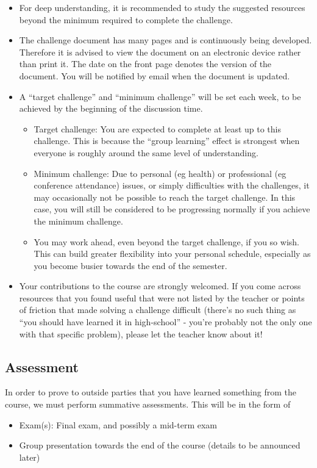 \begin{itemize}
    \item For deep understanding, it is recommended to study the suggested resources beyond the minimum required to complete the challenge.
    \item The challenge document has many pages and is continuously being developed. Therefore it is advised to view the document on an electronic device rather than print it. The date on the front page denotes the version of the document. You will be notified by email when the document is updated.
    \item A “target challenge” and “minimum challenge” will be set each week, to be achieved by the beginning of the discussion time.
    \begin{itemize}
        \item Target challenge: You are expected to complete at least up to this challenge. This is because the “group learning” effect is strongest when everyone is roughly around the same level of understanding.
        \item Minimum challenge: Due to personal (eg health) or professional (eg conference attendance) issues, or simply difficulties with the challenges, it may occasionally not be possible to reach the target challenge. In this case, you will still be considered to be progressing normally if you achieve the minimum challenge.
        \item You may work ahead, even beyond the target challenge, if you so wish. This can build greater flexibility into your personal schedule, especially as you become busier towards the end of the semester.
    \end{itemize}
    \item Your contributions to the course are strongly welcomed. If you come across resources that you found useful that were not listed by the teacher or points of friction that made solving a challenge difficult (there's no such thing as ``you should have learned it in high-school'' - you're probably not the only one with that specific problem), please let the teacher know about it!
\end{itemize}

\subsection{Assessment}
In order to prove to outside parties that you have learned something from the course, we must perform summative assessments. This will be in the form of
\begin{itemize}
    \item Exam(s): Final exam, and possibly a mid-term exam
    \item Group presentation towards the end of the course (details to be announced later)
\end{itemize}

